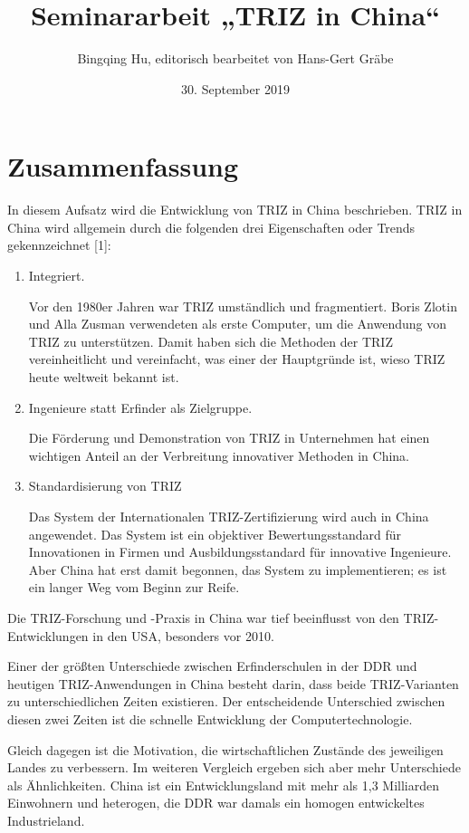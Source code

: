\documentclass[11pt,a4paper]{article}
\title{Seminararbeit „TRIZ in China“}
\author{Bingqing Hu, editorisch bearbeitet von Hans-Gert Gräbe}
\date{30. September 2019}
\begin{document}
\maketitle
{\small \tableofcontents}

\section*{Zusammenfassung}
In diesem Aufsatz wird die Entwicklung von TRIZ in China beschrieben.  TRIZ in
China wird allgemein durch die folgenden drei Eigenschaften oder Trends
gekennzeichnet [1]:
\begin{enumerate}
\item Integriert.
  
Vor den 1980er Jahren war TRIZ umständlich und fragmentiert. Boris Zlotin und
Alla Zusman verwendeten als erste Computer, um die Anwendung von TRIZ zu
unterstützen.  Damit haben sich die Methoden der TRIZ vereinheitlicht und
vereinfacht, was einer der Hauptgründe ist, wieso TRIZ heute weltweit bekannt
ist.

\item Ingenieure statt Erfinder als Zielgruppe.
  
Die Förderung und Demonstration von TRIZ in Unternehmen hat einen wichtigen
Anteil an der Verbreitung innovativer Methoden in China.

\item Standardisierung von TRIZ
  
Das System der Internationalen TRIZ-Zertifizierung wird auch in China
angewendet. Das System ist ein objektiver Bewertungsstandard für Innovationen
in Firmen und Ausbildungsstandard für innovative Ingenieure. Aber China hat
erst damit begonnen, das System zu implementieren; es ist ein langer Weg vom
Beginn zur Reife.
\end{enumerate}

Die TRIZ-Forschung und -Praxis in China war tief beeinflusst von den
TRIZ-Entwicklungen in den USA, besonders vor 2010.

Einer der größten Unterschiede zwischen Erfinderschulen in der DDR und
heutigen TRIZ-Anwendungen in China besteht darin, dass beide TRIZ-Varianten zu
unterschiedlichen Zeiten existieren.  Der entscheidende Unterschied zwischen
diesen zwei Zeiten ist die schnelle Entwicklung der Computertechnologie.

Gleich dagegen ist die Motivation, die wirtschaftlichen Zustände des
jeweiligen Landes zu verbessern.  Im weiteren Vergleich ergeben sich aber mehr
Unterschiede als Ähnlichkeiten. China ist ein Entwicklungsland mit mehr als
1,3 Milliarden Einwohnern und heterogen, die DDR war damals ein homogen
entwickeltes Industrieland.
\end{document}
